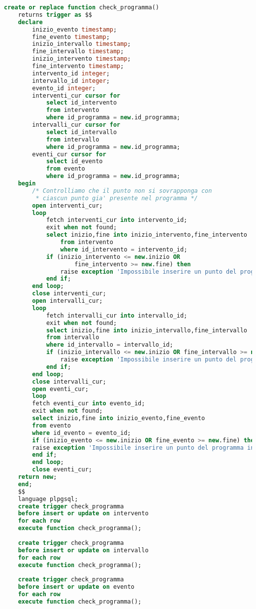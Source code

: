 \begin{lstlisting}[language=SQL,style=mystyle,caption={check\_programma\_entry}]
	create or replace function check_programma() 
	returns trigger as $$
	declare
		inizio_evento timestamp;
		fine_evento timestamp;
		inizio_intervallo timestamp;
		fine_intervallo timestamp;
		inizio_intervento timestamp;
		fine_intervento timestamp;
		intervento_id integer;
		intervallo_id integer;
		evento_id integer;
		interventi_cur cursor for 
			select id_intervento 
			from intervento 
			where id_programma = new.id_programma;
		intervalli_cur cursor for 
			select id_intervallo 
			from intervallo 
			where id_programma = new.id_programma;	
		eventi_cur cursor for 
			select id_evento 
			from evento 
			where id_programma = new.id_programma;
	begin
		/* Controlliamo che il punto non si sovrapponga con
		 * ciascun punto gia' presente nel programma */
		open interventi_cur;
		loop 
			fetch interventi_cur into intervento_id;
			exit when not found;
			select inizio,fine into inizio_intervento,fine_intervento
				from intervento
				where id_intervento = intervento_id;
			if (inizio_intervento <= new.inizio OR 
					fine_intervento >= new.fine) then
				raise exception 'Impossibile inserire un punto del programma in questo orario';
			end if;
		end loop;
		close interventi_cur;
		open intervalli_cur;
		loop 
			fetch intervalli_cur into intervallo_id;
			exit when not found;
			select inizio,fine into inizio_intervallo,fine_intervallo
			from intervallo
			where id_intervallo = intervallo_id;
			if (inizio_intervallo <= new.inizio OR fine_intervallo >= new.fine) then
				raise exception 'Impossibile inserire un punto del programma in questo orario';
			end if;
		end loop;
		close intervalli_cur;
		open eventi_cur;
		loop 
		fetch eventi_cur into evento_id;
		exit when not found;
		select inizio,fine into inizio_evento,fine_evento
		from evento
		where id_evento = evento_id;
		if (inizio_evento <= new.inizio OR fine_evento >= new.fine) then
		raise exception 'Impossibile inserire un punto del programma in questo orario';
		end if;
		end loop;
		close eventi_cur;
	return new;
	end;
	$$ 
	language plpgsql;
	create trigger check_programma
	before insert or update on intervento
	for each row
	execute function check_programma();
	
	create trigger check_programma
	before insert or update on intervallo
	for each row
	execute function check_programma();
	
	create trigger check_programma
	before insert or update on evento
	for each row
	execute function check_programma();
\end{lstlisting}

